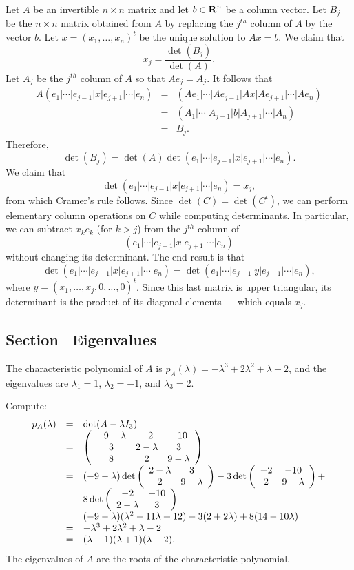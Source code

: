 Let $A$ be an invertible $n\times n$ matrix and let $b\in\mbox{$\bf{R}$}^n$ be a column 
vector. Let $B_j$ be the $n\times n$ matrix obtained from $A$ by replacing 
the $j^{th}$ column of $A$ by the vector $b$.  Let $x=(x_1,\ldots,x_n)^t$ be 
the unique solution to $Ax=b$.  We claim that
\[
x_j = \frac{\det(B_j)}{\det(A)}.
\]
Let $A_j$ be the $j^{th}$ column of $A$ so that $Ae_j=A_j$.  It follows that 
\begin{eqnarray*}
A (e_1|\cdots|e_{j-1}|x|e_{j+1}|\cdots|e_n) & = & 
(A e_1|\cdots|A e_{j-1}|A x|A e_{j+1}|\cdots|A e_n)\\
& = & (A_1|\cdots|A_{j-1}|b|A_{j+1}|\cdots|A_n) \\
& = & B_j.
\end{eqnarray*}
Therefore,
\[
\det(B_j) = \det(A)\det(e_1|\cdots|e_{j-1}|x|e_{j+1}|\cdots|e_n).
\]
We claim that 
\[
\det(e_1|\cdots|e_{j-1}|x|e_{j+1}|\cdots|e_n)=x_j,
\]
from which Cramer's rule follows.  Since $\det(C)=\det(C^t)$, we can perform
elementary column operations on $C$ while computing determinants.  In
particular, we can subtract $x_ke_k$ (for $k>j$) from the $j^{th}$ column of
\[
(e_1|\cdots|e_{j-1}|x|e_{j+1}|\cdots|e_n)
\]
without changing its determinant.  The end result is that 
\[
\det(e_1|\cdots|e_{j-1}|x|e_{j+1}|\cdots|e_n)=
\det(e_1|\cdots|e_{j-1}|y|e_{j+1}|\cdots|e_n),
\]
where $y=(x_1,\ldots,x_j,0,\ldots,0)^t$.  Since this last matrix is upper
triangular, its determinant is the product of its diagonal elements ---
which equals $x_j$. 

\subsection*{Section~\protect{\ref{S:eig}} Eigenvalues}

\ans The characteristic polynomial of $A$ is $p_A(\lambda) =
-\lambda^3 + 2\lambda^2 + \lambda - 2$, and the eigenvalues are
$\lambda_1 = 1$, $\lambda_2 = -1$, and $\lambda_3 = 2$.

\soln Compute:
\[
\begin{array}{rcl}
p_A(\lambda) & = & \det(A - \lambda I_3) \\
& = & \left(\begin{array}{ccc} -9 - \lambda & -2 & -10 \\ 3 & 2 - \lambda & 3 \\ 8 & 2 & 9 - \lambda\end{array}\right) \\
& = & (-9 - \lambda)\det\left(\begin{array}{cc} 2 - \lambda & 3\\ 2 &9 - \lambda\end{array}\right)
- 3\det\left(\begin{array}{cc} -2 & -10\\ 2 &9 - \lambda\end{array}\right) + \\
& & 8\det\left(\begin{array}{cc} -2 & -10\\ 2 - \lambda &3\end{array}\right) \\
& = & (-9 - \lambda)(\lambda^2 - 11\lambda + 12)
- 3(2 + 2\lambda) + 8(14 - 10\lambda) \\
& = & -\lambda^3 + 2\lambda^2 + \lambda - 2 \\
& = & (\lambda - 1)(\lambda + 1)(\lambda - 2). \end{array}
\]
The eigenvalues of $A$ are the roots of the characteristic polynomial.

